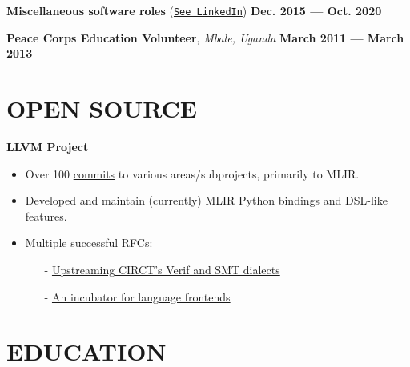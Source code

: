 \documentclass[11pt,letterpaper,roman,colorlinks,linkcolor=blue]{moderncv}
\newcommand*{\modern}{\fontfamily{qhv}\selectfont}
\newcommand{\mystyle}[1]{\textcolor{mygrey}{\modern #1}}
\newcommand{\mysectionstyle}[1]{\large\mystyle{#1}}
\begin{document}
\textbf{Miscellaneous software roles} (\href{https://www.linkedin.com/in/maksim-levental-b6ab5085/}{\texttt{See LinkedIn}})
\hfill \textbf{Dec. 2015 --- Oct. 2020}

\textbf{Peace Corps Education Volunteer}, \emph{Mbale, Uganda}
\hfill \textbf{March 2011 --- March 2013}


\section{\mysectionstyle{OPEN SOURCE}}
\textbf{LLVM Project}
\begin{itemize}
\item Over 100 \href{https://github.com/llvm/llvm-project/pulls?q=is%3Apr+author%3Amakslevental+is%3Aclosed}{commits} to various areas/subprojects, primarily to MLIR.
\item Developed and maintain (currently) MLIR Python bindings and DSL-like features.
\item Multiple successful RFCs:
    \begin{itemize}
      \item[-]{\small \href{https://discourse.llvm.org/t/rfc-upstreaming-circts-verif-and-smt-dialects/85299/19}{Upstreaming CIRCT’s Verif and SMT dialects}}
      \item[-]{\small \href{https://discourse.llvm.org/t/rfc-an-incubator-for-language-frontends-bindings/82832}{An incubator for language frontends}}
    \end{itemize}
\end{itemize}

\section{\mysectionstyle{EDUCATION}}
\end{document}
